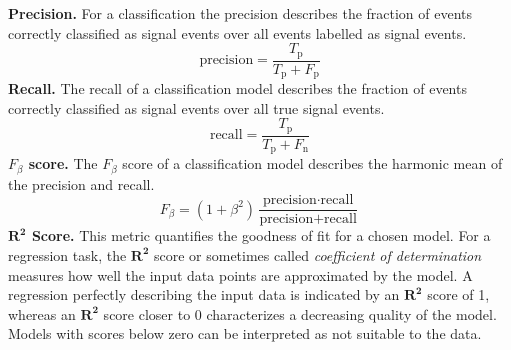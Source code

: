 \textbf{Precision.} For a classification the precision describes the fraction
of events correctly classified as signal events over all events labelled as
signal events.
%
\begin{equation}
  \text{precision} = \frac{T_{\text{p}}}{T_{\text{p}} + F_{\text{p}}}
\end{equation}
%
\textbf{Recall.} The recall of a classification model describes the fraction
of events correctly classified as signal events over all true signal events.
%
\begin{equation}
  \text{recall} = \frac{T_{\text{p}}}{T_{\text{p}} + F_{\text{n}}}
\end{equation}
%
\textbf{$F_\beta$ score.} The $F_\beta$ score of a classification model describes the harmonic mean of the precision and recall.
%
\begin{equation}
  F_\beta = (1 + \beta^2)\frac{\text{precision} \cdot \text{recall}}{\text{precision} + \text{recall}}
\end{equation}
%
\textbf{$\symbf{R^2}$ Score.} This metric quantifies the goodness of fit for a
chosen model. For a regression task, the $\symbf{R^2}$ score or sometimes
called \textit{coefficient of determination} measures how well the input data
points are approximated by the model. A regression perfectly describing the
input data is indicated by an $\symbf{R^2}$ score of 1, whereas an
$\symbf{R^2}$ score closer to \num{0} characterizes a decreasing quality of the
model. Models with scores below zero can be interpreted as not suitable to the
data.
